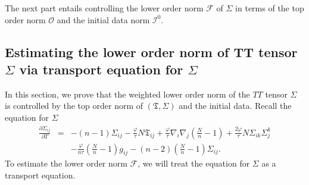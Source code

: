 \documentclass{amsart}
\begin{document}

\noindent The next part entails controlling the lower order norm $\mathcal{F}$ of $\Sigma$ in terms of the top order norm $\mathcal{O}$ and the initial data norm $\mathcal{I}^{0}$. 

\subsection{Estimating the lower order norm of TT tensor $\Sigma$ via transport equation for $\Sigma$}
\label{entropy}
\noindent In this section, we prove that the weighted lower order norm of the $TT$ tensor $\Sigma$ is controlled by the top order norm of $(\mathfrak{T},\Sigma)$ and the initial data. Recall the equation for $\Sigma$
\begin{align}
\frac{\partial \Sigma_{ij}}{\partial T}&=&-(n-1)\Sigma_{ij}-\frac{\varphi}{\tau}N\mathfrak{T}_{ij}+\frac{\varphi}{\tau}\nabla_{i}\nabla_{j}(\frac{N}{n}-1)+\frac{2\varphi}{\tau}N\Sigma_{ik}\Sigma^{k}_{j}\\
 &&\nonumber-\frac{\varphi}{n\tau}(\frac{N}{n}-1)g_{ij}-(n-2)(\frac{N}{n}-1)\Sigma_{ij}.    
\end{align}
To estimate the lower order norm $\mathcal{F}$, we will treat the equation for $\Sigma$ as a transport equation. 
\end{document}
